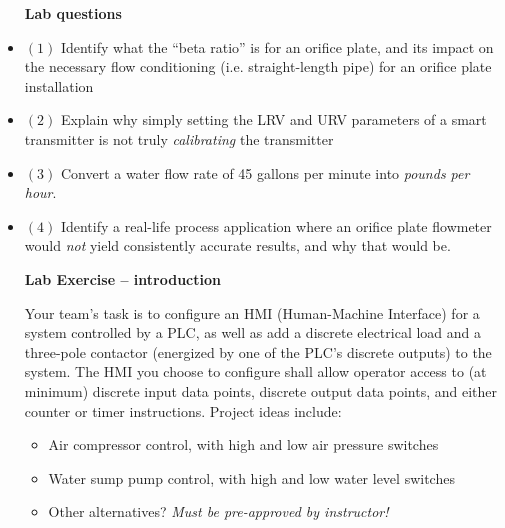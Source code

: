 \begin{itemize}
\noindent
{\bf Lab questions}

\vskip 20pt

\item{$(1)$} Identify what the ``beta ratio'' is for an orifice plate, and its impact on the necessary flow conditioning (i.e. straight-length pipe) for an orifice plate installation

\vskip 20pt

\item{$(2)$} Explain why simply setting the LRV and URV parameters of a smart transmitter is not truly {\it calibrating} the transmitter

\vskip 20pt

\item{$(3)$} Convert a water flow rate of 45 gallons per minute into {\it pounds per hour}.

\vskip 20pt

\item{$(4)$} Identify a real-life process application where an orifice plate flowmeter would {\it not} yield consistently accurate results, and why that would be.
 








\noindent
{\bf Lab Exercise -- introduction}

\vskip 5pt

Your team's task is to configure an HMI (Human-Machine Interface) for a system controlled by a PLC, as well as add a discrete electrical load and a three-pole contactor (energized by one of the PLC's discrete outputs) to the system.  The HMI you choose to configure shall allow operator access to (at minimum) discrete input data points, discrete output data points, and either counter or timer instructions.  Project ideas include:

\begin{itemize}
\item{} Air compressor control, with high and low air pressure switches
\vskip 5pt
\item{} Water sump pump control, with high and low water level switches
\vskip 5pt
\item{} Other alternatives? {\it Must be pre-approved by instructor!}
\end{itemize}


\end{itemize}
